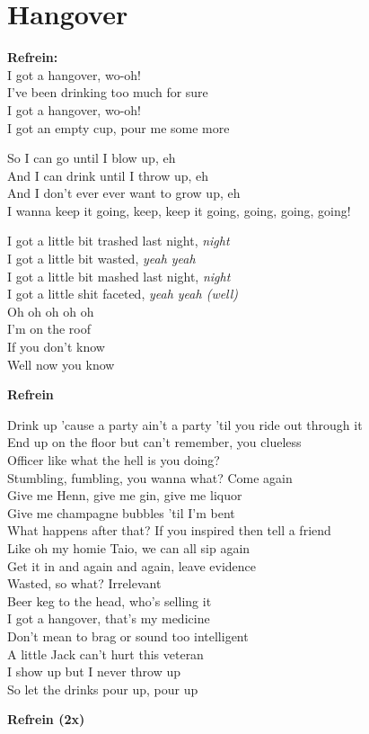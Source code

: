 \section{Hangover}
\textbf{Refrein:}\\
I got a hangover, wo-oh!\\
I've been drinking too much for sure\\
I got a hangover, wo-oh!\\
I got an empty cup, pour me some more

So I can go until I blow up, eh\\
And I can drink until I throw up, eh\\
And I don't ever ever want to grow up, eh\\
I wanna keep it going, keep, keep it going, going, going, going!

I got a little bit trashed last night, \textit{night}\\
I got a little bit wasted, \textit{yeah yeah}\\
I got a little bit mashed last night, \textit{night}\\
I got a little shit faceted, \textit{yeah yeah (well)}\\
Oh oh oh oh oh\\
I'm on the roof\\
If you don't know\\
Well now you know

\textbf{Refrein}

Drink up 'cause a party ain't a party 'til you ride out through it\\
End up on the floor but can't remember, you clueless\\
Officer like what the hell is you doing?\\
Stumbling, fumbling, you wanna what? Come again\\
Give me Henn, give me gin, give me liquor\\
Give me champagne bubbles 'til I'm bent\\
What happens after that? If you inspired then tell a friend\\
Like oh my homie Taio, we can all sip again\\
Get it in and again and again, leave evidence\\
Wasted, so what? Irrelevant\\
Beer keg to the head, who's selling it\\
I got a hangover, that's my medicine\\
Don't mean to brag or sound too intelligent\\
A little Jack can't hurt this veteran\\
I show up but I never throw up\\
So let the drinks pour up, pour up

\textbf{Refrein (2x)}